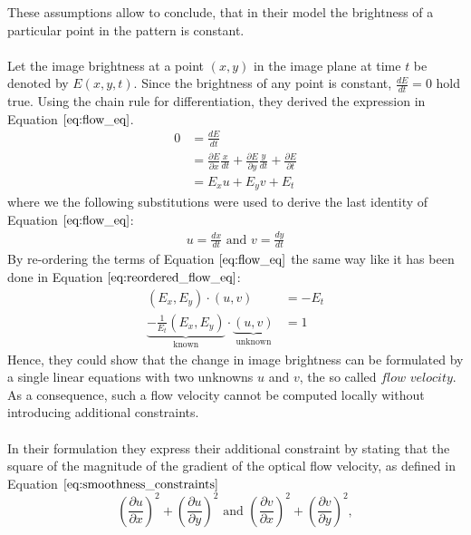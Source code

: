 These assumptions allow to conclude, that in their model the brightness of a particular point in the pattern is constant. \\ \\
Let the image brightness at a point $(x,y)$ in the image plane at time $t$ be denoted by $E(x,y,t)$. Since the brightness of any point is constant, $\frac{d E}{dt} = 0$ hold true. Using the chain rule for differentiation, they derived the expression in Equation $\ref{eq:flow_eq}$.  
\begin{equation}
\begin{aligned}
0 &= \frac{d E}{dt} \\
&= \frac{\partial E}{\partial x} \frac{x}{dt} + \frac{\partial E}{\partial y} \frac{y}{dt} + \frac{\partial E}{\partial t} \\
&= E_{x} u + E_{y} v + E_{t}
\end{aligned}
\label{eq:flow_eq}	
\end{equation}
where we the following substitutions were used to derive the last identity of Equation $\ref{eq:flow_eq}$:
\begin{equation}
\begin{aligned}
	u = \frac{dx}{dt} \text{ and } v = \frac{dy}{dt}
\end{aligned}
\end{equation}
By re-ordering the terms of Equation $\ref{eq:flow_eq}$ the same way like it has been done in Equation $\ref{eq:reordered_flow_eq}$:
\begin{equation}
\begin{aligned}
	(E_x, E_y) \cdot (u, v) &= -E_t \\
	\underbrace{-\frac{1}{E_t}\left( E_x, E_y \right)}_\text{known} \cdot \underbrace{(u, v)}_\text{unknown} &= 1
\end{aligned}
\label{eq:reordered_flow_eq}
\end{equation}
Hence, they could show that the change in image brightness can be formulated by a single linear equations with two unknowns $u$ and $v$, the so called $\textit{flow velocity}$. As a consequence, such a flow velocity cannot be computed locally without introducing additional constraints. \\ \\
In their formulation they express their additional constraint by stating that the square of the magnitude of the gradient of the optical flow velocity, as defined in Equation $\ref{eq:smoothness_constraints}$
\begin{equation}
	\left( \frac{\partial u}{\partial x} \right)^2 + \left( \frac{\partial u}{\partial y} \right)^2 \text{ and } \left( \frac{\partial v}{\partial x} \right)^2 + \left( \frac{\partial v}{\partial y} \right)^2,
\label{eq:smoothness_constraints}
\end{equation}
